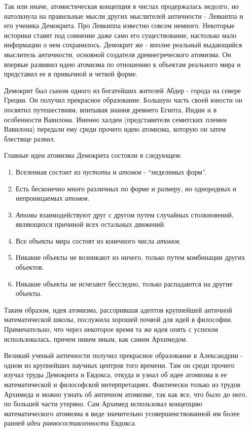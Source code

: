 Так или иначе, атомистическая концепция в числах продержалась недолго, но натолкнула на правильные мысли других мыслителей античности - Левкиппа и его ученика Демокрита.
Про Левкиппа известно совсем немного.
Некоторые историки ставят под сомнение даже само его существование, настолько мало информации о нем сохранилось.
Демокрит же - вполне реальный выдающийся мыслитель античности, основной создателя древнегреческого атомизма. 
Он впервые развивил идею атомизма по отношению к объектам реального мира и представил ее в привычной и четкой форме.

Демокрит был сыном одного из богатейших жителей Абдер - города на севере Греции.
Он получил прекрасное образование. 
Большую часть своей юности он посвятил путешествиям, впитывая знания древнего Египта, Индии и в особенности Вавилона.
Именно халдеи (представители семитских племен Вавилона) передали ему среди прочего идею атомизма, которую он затем блестяще развил.

Главные идеи атомизма Демокрита состояли в следующем:
\begin{enumerate}
    \item Вселенная состоит из \textit{пустоты} и \textit{атомов} - ``неделимых форм''.
    \item Есть бесконечно много различных по форме и размеру, но однородных и непроницаемых \textit{атомов}.
    \item \textit{Атомы} взаимодействуют друг с другом путем случайных столкновений, являющихся причиной всех остальных движений. 
    \item Все объекты мира состоят из конечного числа \textit{атомов}.
    \item Никакие объекты не возникают из ничего, только путем комбинации других объектов.
    \item Никакие объекты не исчезают бесследно, только распадаются на другие объекты.
\end{enumerate} 

Таким образом, идея атомизма, рассорившая адептов крупнейшей античной математической школы, послужила хорошей почвой для идей в философии. 
Примечательно, что через некоторое время та же идея опять с успехом использовалась, причем никем иным, как самим Архимедом.

Великий ученый античности получил прекрасное образование в Александрии - одном из крупнейших научных центров того времени. 
Там он среди прочего изучал труды Демокрита и Евдокса, откуда и узнал об идее атомизма в ее математической и философской интерпретациях.
Фактически только из трудов Архимеда и можно узнать об античном атомизме, так как все, что было до него, по большей части утеряно.
Сам Архимед использовал концепцию математического атомизма в виде значительно усовершенствованной им более ранней \textit{идеи равносоставленности} Евдокса.

